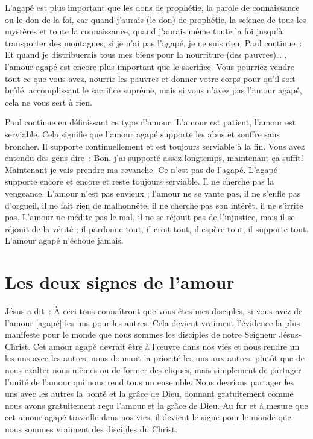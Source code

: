L'agapé est plus important que les dons de prophétie,
 la parole de connaissance ou le don de la foi,
 car \og quand j'aurais (le don) de prophétie,
 la science de tous les mystères et toute la connaissance,
 quand j'aurais même toute la foi jusqu'à transporter des montagnes,
 si je n'ai pas l'agapé, je ne suis rien. \fg{} Paul continue~:
 \og Et quand je distribuerais tous mes biens
 pour la nourriture (des pauvres)\dots{} \fg{},
 l'amour agapé est encore plus important que le sacrifice.
 Vous pourriez vendre tout ce que vous avez, nourrir les pauvres
 et donner votre corps pour qu'il soit brûlé, accomplissant le sacrifice
 suprême, mais si vous n'avez pas l'amour agapé,
 cela ne vous sert à rien.
 \nowidow[6]
 

Paul continue en définissant ce type d'amour.
 \og L'amour est patient, l'amour est serviable. \fg{}
 Cela signifie que l'amour agapé supporte les abus et souffre sans broncher.
 Il supporte continuellement et est toujours serviable à la fin.
 Vous avez entendu des gens dire~:
 \og Bon, j'ai supporté assez longtemps, maintenant ça suffit!
 Maintenant je vais prendre ma revanche. \fg{}
 Ce n'est pas de l'agapé. L'agapé supporte encore et encore
 et reste toujours serviable. Il ne cherche pas la vengeance.
 \og L'amour n'est pas envieux ; l'amour ne se vante pas,
 il ne s'enfle pas d'orgueil, il ne fait rien de malhonnête,
 il ne cherche pas son intérêt, il ne s'irrite pas.
 L'amour ne médite pas le mal, il ne se réjouit pas de l'injustice,
 mais il se réjouit de la vérité ; il pardonne tout, il croit tout,
 il espère tout, il supporte tout. \fg{}
 L'amour agapé \og n'échoue jamais. \fg{}


\section{Les deux signes de l'amour}

Jésus a dit~:
 \og À ceci tous connaîtront que vous êtes mes disciples,
 si vous avez de l'amour [agapé] les uns pour les autres. \fg{}
 Cela devient vraiment l'évidence la plus manifeste pour le monde
 que nous sommes les disciples de notre Seigneur Jésus-Christ.
 Cet amour agapé devrait être à l'œuvre dans nos vies et nous rendre un
 les uns avec les autres, nous donnant la priorité les uns aux autres,
 plutôt que de nous exalter nous-mêmes ou de former des cliques,
 mais simplement de partager l'unité de l'amour qui nous rend
 tous un ensemble.
 Nous devrions partager les uns avec les autres la bonté et la grâce de Dieu,
 donnant gratuitement comme nous avons gratuitement reçu l'amour
 et la grâce de Dieu.
 Au fur et à mesure que cet amour agapé travaille dans nos vies,
 il devient le signe pour le monde que nous sommes vraiment
 des disciples du Christ.

